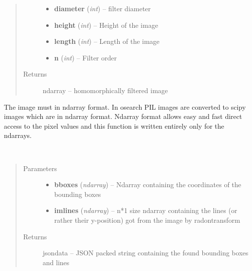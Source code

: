 \documentclass[letterpaper,10pt,english]{sphinxmanual}
\begin{document}
\begin{fulllineitems}
\begin{fulllineitems}
\begin{quote}
\begin{description}
\begin{itemize}
\item {} 
\textbf{diameter} (\emph{int}) -- filter diameter

\item {} 
\textbf{height} (\emph{int}) -- Height of the image

\item {} 
\textbf{length} (\emph{int}) -- Length of the image

\item {} 
\textbf{n} (\emph{int}) -- Filter order

\end{itemize}

\item[{Returns}] \leavevmode
ndarray -- homomorphically filtered image

\end{description}\end{quote}

The image must in ndarray format. In osearch PIL images are converted to scipy images which 
are in ndarray format. Ndarray format allows easy and fast direct access to the pixel values 
and this function is written entirely only for the ndarrays.

\end{fulllineitems}


\begin{fulllineitems}
\label{code:OratUtils.OratUtils.packBoxesAndLines}~\begin{quote}\begin{description}
\item[{Parameters}] \leavevmode\begin{itemize}
\item {} 
\textbf{bboxes} (\emph{ndarray}) -- Ndarray containing the coordinates of the bounding boxes

\item {} 
\textbf{imlines} (\emph{ndarray}) -- n*1 size ndarray containing the lines (or rather their y-position) got from the image by radontransform

\end{itemize}

\item[{Returns}] \leavevmode
jsondata -- JSON packed string containing the found bounding boxes and lines


\end{description}
\end{quote}
\end{fulllineitems}
\end{fulllineitems}
\end{document}
